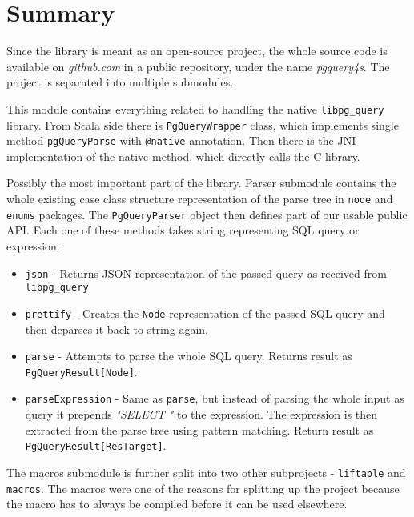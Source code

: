 \section{Summary}
Since the library is meant as an open-source project, the whole source code is available on \textit{github.com} in a public repository, under the name \textit{pgquery4s}. The project is separated into multiple submodules.

\begin{description}[font=$\bullet$~\normalfont\scshape\color{black}\\]
\item [Native] \hfill \newline
This module contains everything related to handling the native \texttt{libpg\_query} library. From Scala side there is \texttt{PgQueryWrapper} class, which implements single method \texttt{pgQueryParse} with \texttt{@native} annotation. Then there is the JNI implementation of the native method, which directly calls the C library.
\item [Parser] \hfill \newline
Possibly the most important part of the library. Parser submodule contains the whole existing case class structure representation of the parse tree in \texttt{node} and \texttt{enums} packages. The \texttt{PgQueryParser} object then defines part of our usable public API. Each one of these methods takes string representing SQL query or expression: 
\begin{itemize}
    \item \texttt{json} - Returns JSON representation of the passed query as received from \texttt{libpg\_query}
    \item \texttt{prettify} - Creates the \texttt{Node} representation of the passed SQL query and then deparses it back to string again.
    \item \texttt{parse} - Attempts to parse the whole SQL query. Returns result as \texttt{PgQueryResult[Node]}.
    \item \texttt{parseExpression} - Same as \texttt{parse}, but instead of parsing the whole input as query it prepends \textit{"SELECT "} to the expression. The expression is then extracted from the parse tree using pattern matching. Return result as \texttt{PgQueryResult[ResTarget]}.
\end{itemize}

\item [Macros] \hfill \newline
The macros submodule is further split into two other subprojects - \texttt{liftable} and \texttt{macros}. The macros were one of the reasons for splitting up the project because the macro has to always be compiled before it can be used elsewhere. 


\end{description}
